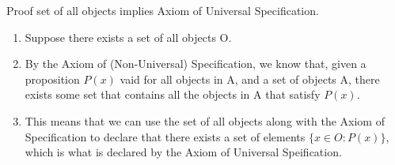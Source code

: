 \documentclass{article}
\begin{document}
\begin{enumerate}
            Proof set of all objects implies Axiom of Universal Specification.
            \begin{enumerate}
                \item Suppose there exists a set of all objects O.
                \item By the Axiom of (Non-Universal) Specification, we know
                    that, given a proposition $P(x)$ vaid for all objects in A,
                    and a set of objects A, there exists some set that contains
                    all the objects in A that satisfy $P(x)$.
                \item This means that we can use the set of all objects along
                    with the Axiom of Specification to declare that there
                    exists a set of elements $\{x \in O: P(x)\}$, which is what
                    is declared by the Axiom of Universal Speification.
            \end{enumerate}
    \end{enumerate}
\end{document}
